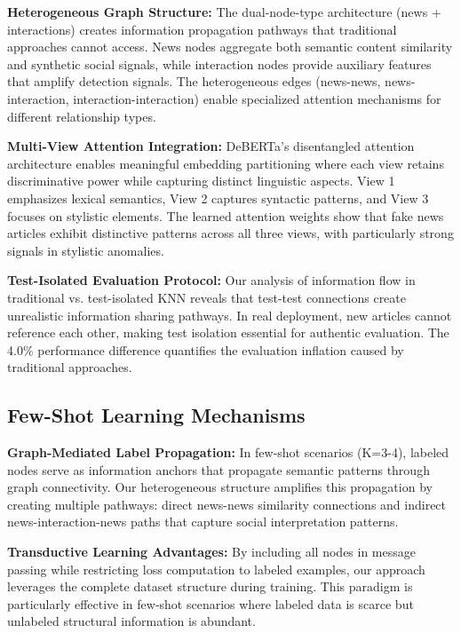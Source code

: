 \textbf{Heterogeneous Graph Structure:} The dual-node-type architecture (news + interactions) creates information propagation pathways that traditional approaches cannot access. News nodes aggregate both semantic content similarity and synthetic social signals, while interaction nodes provide auxiliary features that amplify detection signals. The heterogeneous edges (news-news, news-interaction, interaction-interaction) enable specialized attention mechanisms for different relationship types.

\textbf{Multi-View Attention Integration:} DeBERTa's disentangled attention architecture enables meaningful embedding partitioning where each view retains discriminative power while capturing distinct linguistic aspects. View 1 emphasizes lexical semantics, View 2 captures syntactic patterns, and View 3 focuses on stylistic elements. The learned attention weights show that fake news articles exhibit distinctive patterns across all three views, with particularly strong signals in stylistic anomalies.

\textbf{Test-Isolated Evaluation Protocol:} Our analysis of information flow in traditional vs. test-isolated KNN reveals that test-test connections create unrealistic information sharing pathways. In real deployment, new articles cannot reference each other, making test isolation essential for authentic evaluation. The 4.0\% performance difference quantifies the evaluation inflation caused by traditional approaches.

\subsection{Few-Shot Learning Mechanisms}

\textbf{Graph-Mediated Label Propagation:} In few-shot scenarios (K=3-4), labeled nodes serve as information anchors that propagate semantic patterns through graph connectivity. Our heterogeneous structure amplifies this propagation by creating multiple pathways: direct news-news similarity connections and indirect news-interaction-news paths that capture social interpretation patterns.

\textbf{Transductive Learning Advantages:} By including all nodes in message passing while restricting loss computation to labeled examples, our approach leverages the complete dataset structure during training. This paradigm is particularly effective in few-shot scenarios where labeled data is scarce but unlabeled structural information is abundant.

